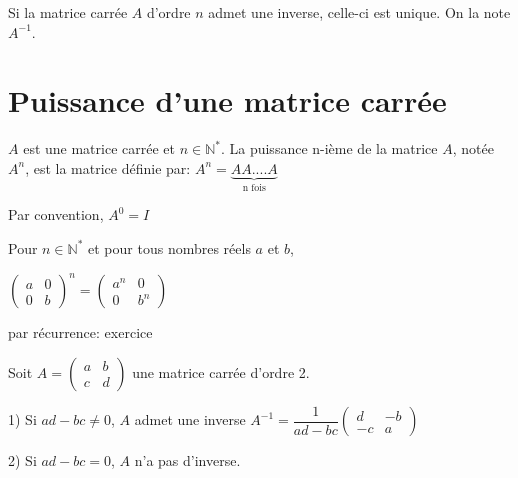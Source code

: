 \documentclass[french]{book}
\begin{document}
\begin{prop}
   
   Si la matrice carrée $A$ d'ordre $n$ admet une inverse, celle-ci est unique. On la note $A^{-1}$.
   
\end{prop}
   
 \section{Puissance d'une matrice carrée}
   \begin{defn}
   
   $A$ est une matrice carrée et $n \in \mathbb{N}^{*}$. La puissance n-ième de la matrice $A$, notée $A^{n}$, est la matrice définie par: $A^{n}=\underbrace{AA....A}_{\text{n fois}}$
   
    Par convention, $A^{0}=I$
   
  \end{defn}
  
   \begin{thm}
   
   Pour $n \in \mathbb{N}^{*}$ et pour tous nombres réels $a$ et $b$,
    
    \begin{center}
    $\begin{pmatrix}
    a & 0  \\ 
   0 & b 
   \end{pmatrix}^{n}=\begin{pmatrix}
    a^{n} & 0  \\ 
   0 & b^{n} 
   \end{pmatrix}$
    \end{center}
   \end{thm}
   
    \begin{demo}
    par récurrence: exercice
	\end{demo}
	
	    
\begin{thm}
    
    Soit $A=\begin{pmatrix}
    a & b  \\ 
   c & d 
   \end{pmatrix}$ une matrice carrée d'ordre 2.
   
   1) Si $ad-bc\neq 0$, $A$ admet une inverse $\boxed{A^{-1}=\dfrac{1}{ad-bc}\begin{pmatrix}
    d &-b  \\ 
   -c & a 
   \end{pmatrix}}$
   
   2) Si $ad-bc=0$, $A$ n'a pas d'inverse.
   
  \end{thm}
   
\end{document}
